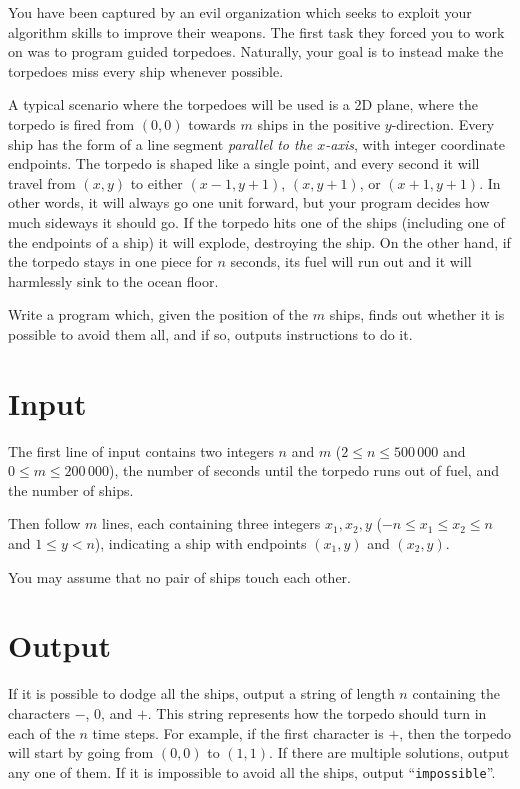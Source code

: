 
%
\noindent
You have been captured by an evil organization which seeks to exploit
your algorithm skills to improve their weapons. The first task they forced you to
work on was to program guided torpedoes.
Naturally, your goal is to instead make the torpedoes miss every ship whenever possible.

A typical scenario where the torpedoes will be used is a 2D plane, where the torpedo is 
fired from $(0,0)$ towards $m$ ships in the positive $y$-direction. Every ship has the 
form of a line segment \textit{parallel to the $x$-axis}, with integer coordinate endpoints.
The torpedo is shaped like a single point, and every second it will travel from $(x,y)$ to either $(x-1,y+1)$, 
$(x,y+1)$, or $(x+1,y+1)$. In other words, it will always go one unit forward, but your 
program decides how much sideways it should go. If the torpedo hits one of the ships (including one of the endpoints of a ship) it will
explode, destroying the ship. On the other hand, if the torpedo stays in one piece for $n$ 
seconds, its fuel will run out and it will harmlessly sink to the ocean floor.

Write a program which, given the position of the $m$ ships, finds out whether it is
possible to avoid them all, and if so, outputs instructions to do it.

\section*{Input}
The first line of input contains two integers $n$ and $m$ ($2 \leq
n \leq 500\,000$ and $0 \leq m \leq 200\,000$), the number of seconds
until the torpedo runs out of fuel, and the number of ships.

Then follow $m$ lines, each containing three integers $x_1, x_2, y$ ($-n \leq x_1 \leq x_2 \leq n$ and $1 \leq y < n$), indicating a ship with endpoints $(x_1, y)$ and $(x_2, y)$.

You may assume that no pair of ships touch each other.

\section*{Output}
If it is possible to dodge all the ships, output a string of length $n$ containing the characters 
$-$, $0$, and $+$. This string represents how the torpedo should turn in each of the $n$ time steps. 
For example, if the first character is $+$, then the torpedo will start by going from $(0,0)$ to $(1,1)$.
If there are multiple solutions, output any one of them.
If it is impossible to avoid all the ships, output ``\texttt{impossible}''.

